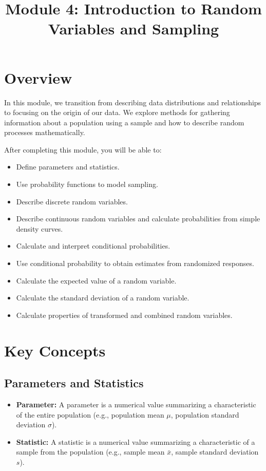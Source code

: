\documentclass{article}
\title{Module 4: Introduction to Random Variables and Sampling}
\author{}
\date{}
\begin{document}
\maketitle

\section*{Overview}

In this module, we transition from describing data distributions and relationships to focusing on the origin of our data. We explore methods for gathering information about a population using a sample and how to describe random processes mathematically.

After completing this module, you will be able to:
\begin{itemize}
    \item Define parameters and statistics.
    \item Use probability functions to model sampling.
    \item Describe discrete random variables.
    \item Describe continuous random variables and calculate probabilities from simple density curves.
    \item Calculate and interpret conditional probabilities.
    \item Use conditional probability to obtain estimates from randomized responses.
    \item Calculate the expected value of a random variable.
    \item Calculate the standard deviation of a random variable.
    \item Calculate properties of transformed and combined random variables.
\end{itemize}

\section*{Key Concepts}

\subsection*{Parameters and Statistics}
\begin{itemize}
    \item \textbf{Parameter:} A parameter is a numerical value summarizing a characteristic of the entire population (e.g., population mean $\mu$, population standard deviation $\sigma$).
    \item \textbf{Statistic:} A statistic is a numerical value summarizing a characteristic of a sample from the population (e.g., sample mean $\bar{x}$, sample standard deviation $s$).
\end{itemize}
\end{document}
